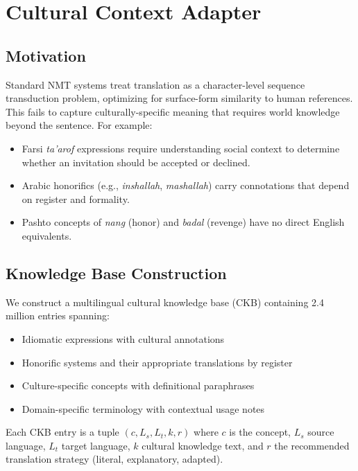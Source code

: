 \documentclass[11pt,twocolumn]{article}
\begin{document}
\section{Cultural Context Adapter}
\label{sec:cca}

\subsection{Motivation}

Standard NMT systems treat translation as a character-level sequence
transduction problem, optimizing for surface-form similarity to human
references. This fails to capture culturally-specific meaning that requires
world knowledge beyond the sentence. For example:

\begin{itemize}[leftmargin=*,noitemsep]
  \item Farsi \textit{ta'arof} expressions require understanding social context
        to determine whether an invitation should be accepted or declined.
  \item Arabic honorifics (e.g., \textit{inshallah}, \textit{mashallah})
        carry connotations that depend on register and formality.
  \item Pashto concepts of \textit{nang} (honor) and \textit{badal} (revenge)
        have no direct English equivalents.
\end{itemize}

\subsection{Knowledge Base Construction}

We construct a multilingual cultural knowledge base (CKB) containing 2.4
million entries spanning:
\begin{itemize}[leftmargin=*,noitemsep]
  \item Idiomatic expressions with cultural annotations
  \item Honorific systems and their appropriate translations by register
  \item Culture-specific concepts with definitional paraphrases
  \item Domain-specific terminology with contextual usage notes
\end{itemize}

Each CKB entry is a tuple $(c, L_s, L_t, k, r)$ where $c$ is the concept,
$L_s$ source language, $L_t$ target language, $k$ cultural knowledge text,
and $r$ the recommended translation strategy (literal, explanatory, adapted).
\end{document}
